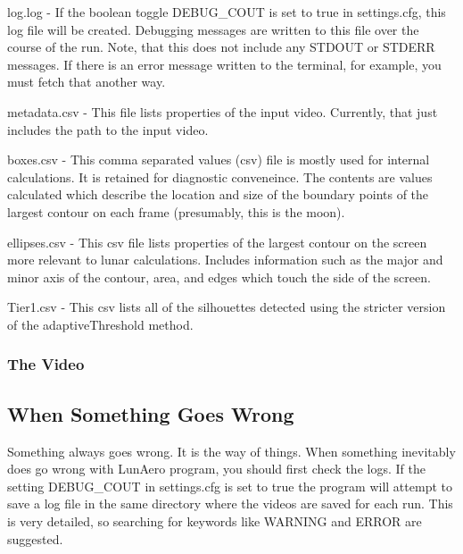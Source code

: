 \begin{DoxyItemize}
\item log.\+log -\/ If the boolean toggle {\ttfamily D\+E\+B\+U\+G\+\_\+\+C\+O\+UT} is set to {\ttfamily true} in settings.\+cfg, this log file will be created. Debugging messages are written to this file over the course of the run. Note, that this does not include any S\+T\+D\+O\+UT or S\+T\+D\+E\+RR messages. If there is an error message written to the terminal, for example, you must fetch that another way.
\item metadata.\+csv -\/ This file lists properties of the input video. Currently, that just includes the path to the input video.
\item boxes.\+csv -\/ This comma separated values (csv) file is mostly used for internal calculations. It is retained for diagnostic conveneince. The contents are values calculated which describe the location and size of the boundary points of the largest contour on each frame (presumably, this is the moon).
\item ellipses.\+csv -\/ This csv file lists properties of the largest contour on the screen more relevant to lunar calculations. Includes information such as the major and minor axis of the contour, area, and edges which touch the side of the screen.
\item Tier1.\+csv -\/ This csv lists all of the silhouettes detected using the stricter version of the {\ttfamily adaptive\+Threshold} method.
\end{DoxyItemize}

\subsubsection*{The Video}

\subsection*{When Something Goes Wrong}

Something always goes wrong. It is the way of things. When something inevitably does go wrong with Lun\+Aero program, you should first check the logs. If the setting {\ttfamily D\+E\+B\+U\+G\+\_\+\+C\+O\+UT} in {\ttfamily settings.\+cfg} is set to {\ttfamily true} the program will attempt to save a log file in the same directory where the videos are saved for each run. This is very detailed, so searching for keywords like {\ttfamily W\+A\+R\+N\+I\+NG} and {\ttfamily E\+R\+R\+OR} are suggested.

